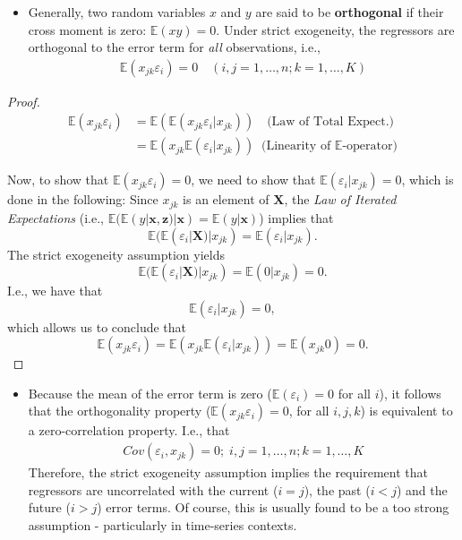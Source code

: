\documentclass[]{book}
\providecommand{\tightlist}{%
  \setlength{\itemsep}{0pt}\setlength{\parskip}{0pt}}
\theoremstyle{definition}
\theoremstyle{definition}
\theoremstyle{definition}
\theoremstyle{remark}
\let\BeginKnitrBlock\begin \let\EndKnitrBlock\end
\begin{document}
\begin{itemize}
\tightlist
\item
  Generally, two random variables \(x\) and \(y\) are said to be
  \textbf{orthogonal} if their cross moment is zero: \(\mathbb{E}(xy)=0\). Under
  strict exogeneity, the regressors are orthogonal to the error term
  for \emph{all} observations, i.e.,
  \begin{align*}
   \mathbb{E}(x_{jk}\varepsilon_i) = 0\quad(i,j=1,\dots,n; k=1,\dots,K)
   \label{eq:c3e5}
   \end{align*}
\end{itemize}

\BeginKnitrBlock{proof}
{}\begin{align*}
      \mathbb{E}(x_{jk}\varepsilon_i) &= \mathbb{E}(\mathbb{E}(x_{jk}\varepsilon_i|x_{jk}))\quad{\text{(Law of Total Expect.)}}\\
       &= \mathbb{E}(x_{jk}\mathbb{E}(\varepsilon_i|x_{jk}))\;\;{\text{(Linearity of $\mathbb{E}$-operator)}}
\end{align*}

Now, to show that \(\mathbb{E}(x_{jk}\varepsilon_i)=0\), we need to show that \(\mathbb{E}(\varepsilon_i|x_{jk})=0\), which is done in the following:
Since \(x_{jk}\) is an element of \(\mathbf{X}\), the \emph{Law of Iterated Expectations} (i.e., \(\mathbb{E}(\mathbb{E}(y|\mathbf{x},\mathbf{z})|\mathbf{x})=\mathbb{E}(y|\mathbf{x})\))
implies that \[\mathbb{E}(\mathbb{E}(\varepsilon_i|\mathbf{X})|x_{jk})=\mathbb{E}(\varepsilon_i|x_{jk}).\] The
strict exogeneity assumption yields
\[\mathbb{E}(\mathbb{E}(\varepsilon_i|\mathbf{X})|x_{jk})=\mathbb{E}(0|x_{jk})=0.\] I.e., we have that
\[\mathbb{E}(\varepsilon_i|x_{jk})=0,\] which allows us to conclude that
\[\mathbb{E}(x_{jk}\varepsilon_i)=\mathbb{E}(x_{jk}\mathbb{E}(\varepsilon_i|x_{jk}))=\mathbb{E}(x_{jk}0)=0.\]
\EndKnitrBlock{proof}

\begin{itemize}
\tightlist
\item
  Because the mean of the error term is zero (\(\mathbb{E}(\varepsilon_i)=0\) for all
  \(i\)), it follows that the orthogonality property
  (\(\mathbb{E}(x_{jk}\varepsilon_i)=0\), for all \(i,j,k\)) is equivalent to a
  zero-correlation property. I.e., that
  \begin{align*}
    Cov(\varepsilon_i,x_{jk}) = 0;\; i,j=1,\dots,n; k=1,\dots,K
     \label{eq:c3e6}
  \end{align*}
  Therefore, the strict exogeneity assumption implies the requirement
  that regressors are uncorrelated with the current (\(i=j\)), the past
  (\(i<j\)) and the future (\(i>j\)) error terms. Of course, this is
  usually found to be a too strong assumption - particularly in
  time-series contexts.
\end{itemize}
\end{document}
